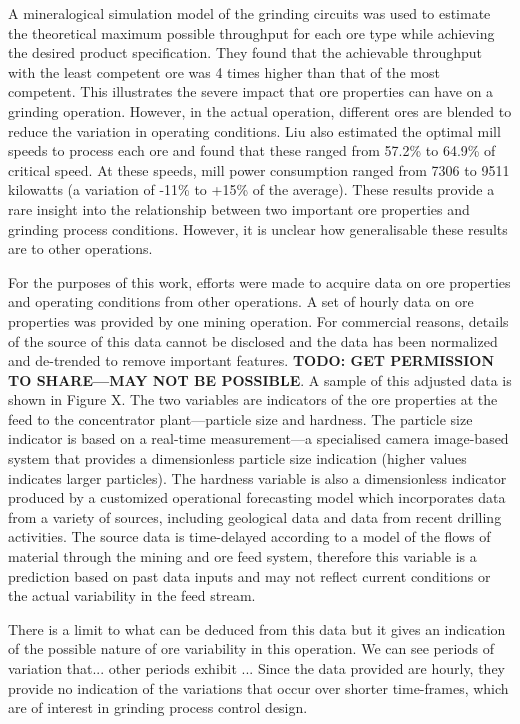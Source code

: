 A mineralogical simulation model of the grinding circuits was used to estimate the theoretical maximum possible throughput for each ore type while achieving the desired product specification. They found that the achievable throughput with the least competent ore was 4 times higher than that of the most competent. This illustrates the severe impact that ore properties can have on a grinding operation. However, in the actual operation, different ores are blended to reduce the variation in operating conditions. Liu also estimated the optimal mill speeds to process each ore and found that these ranged from 57.2\% to 64.9\% of critical speed. At these speeds, mill power consumption ranged from 7306 to 9511 kilowatts (a variation of -11\% to +15\% of the average). These results provide a rare insight into the relationship between two important ore properties and grinding process conditions. However, it is unclear how generalisable these results are to other operations.

For the purposes of this work, efforts were made to acquire data on ore properties and operating conditions from other operations. A set of hourly data on ore properties was provided by one mining operation. For commercial reasons, details of the source of this data cannot be disclosed and the data has been normalized and de-trended to remove important features. \textbf{TODO: GET PERMISSION TO SHARE—MAY NOT BE POSSIBLE}. A sample of this adjusted data is shown in Figure X. The two variables are indicators of the ore properties at the feed to the concentrator plant---particle size and hardness. The particle size indicator is based on a real-time measurement---a specialised camera image-based system that provides a dimensionless particle size indication (higher values indicates larger particles). The hardness variable is also a dimensionless indicator produced by a customized operational forecasting model which incorporates data from a variety of sources, including geological data and data from recent drilling activities. The source data is time-delayed according to a model of the flows of material through the mining and ore feed system, therefore this variable is a prediction based on past data inputs and may not reflect current conditions or the actual variability in the feed stream.

There is a limit to what can be deduced from this data but it gives an indication of the possible nature of ore variability in this operation. We can see periods of variation that...  other periods exhibit ... Since the data provided are hourly, they provide no indication of the variations that occur over shorter time-frames, which are of interest in grinding process control design.

